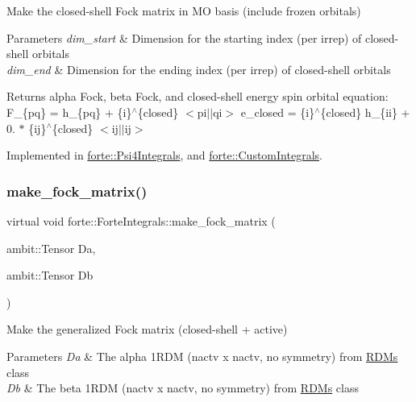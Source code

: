 Make the closed-\/shell Fock matrix in MO basis (include frozen orbitals) 
\begin{DoxyParams}{Parameters}
{\em dim\+\_\+start} & Dimension for the starting index (per irrep) of closed-\/shell orbitals \\
\hline
{\em dim\+\_\+end} & Dimension for the ending index (per irrep) of closed-\/shell orbitals \\
\hline
\end{DoxyParams}
\begin{DoxyReturn}{Returns}
alpha Fock, beta Fock, and closed-\/shell energy spin orbital equation\+: F\+\_\+\{pq\} = h\+\_\+\{pq\} + \{i\}$^\wedge$\{closed\} $<$pi$\vert$$\vert$qi$>$ e\+\_\+closed = \{i\}$^\wedge$\{closed\} h\+\_\+\{ii\} + 0. $\ast$ \{ij\}$^\wedge$\{closed\} $<$ij$\vert$$\vert$ij$>$ 
\end{DoxyReturn}


Implemented in \mbox{\hyperlink{classforte_1_1_psi4_integrals_ac867cd8004611a1fe93c31f1068ad81c}{forte\+::\+Psi4\+Integrals}}, and \mbox{\hyperlink{classforte_1_1_custom_integrals_a00921e140fba2f63eb8399003029ad1a}{forte\+::\+Custom\+Integrals}}.

\mbox{\label{classforte_1_1_forte_integrals_aadd195fbc0c7f7b659ab9280457568e0}} 
\subsubsection{\texorpdfstring{make\+\_\+fock\+\_\+matrix()}{make\_fock\_matrix()}}
{\footnotesize\ttfamily virtual void forte\+::\+Forte\+Integrals\+::make\+\_\+fock\+\_\+matrix (\begin{DoxyParamCaption}\item[{ambit\+::\+Tensor}]{Da,  }\item[{ambit\+::\+Tensor}]{Db }\end{DoxyParamCaption})\hspace{0.3cm}{\ttfamily [pure virtual]}}

Make the generalized Fock matrix (closed-\/shell + active) 
\begin{DoxyParams}{Parameters}
{\em Da} & The alpha 1\+R\+DM (nactv x nactv, no symmetry) from \mbox{\hyperlink{classforte_1_1_r_d_ms}{R\+D\+Ms}} class \\
\hline
{\em Db} & The beta 1\+R\+DM (nactv x nactv, no symmetry) from \mbox{\hyperlink{classforte_1_1_r_d_ms}{R\+D\+Ms}} class \\
\hline
\end{DoxyParams}


